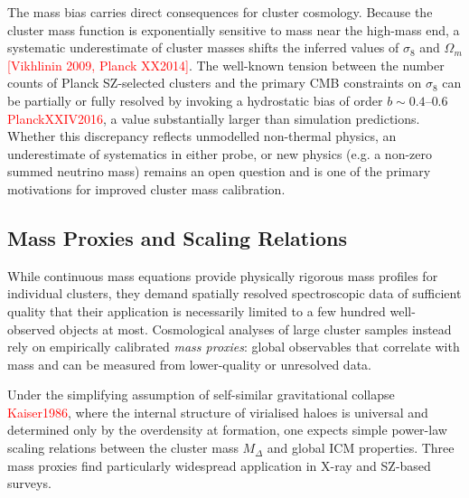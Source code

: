 The mass bias carries direct consequences for cluster cosmology. Because the cluster mass function is exponentially sensitive to mass near the high-mass end, a systematic underestimate of cluster masses shifts the inferred values of $\sigma_8$ and $\Omega_m$ \textcolor{red}{[Vikhlinin 2009, Planck XX2014]}. The well-known tension between the number counts of Planck SZ-selected clusters and the primary CMB constraints on $\sigma_8$ can be partially or fully resolved by invoking a hydrostatic bias of order $b \sim 0.4$--$0.6$ \textcolor{red}{PlanckXXIV2016}, a value substantially larger than simulation predictions. Whether this discrepancy reflects unmodelled non-thermal physics, an underestimate of systematics in either probe, or new physics (e.g. a non-zero summed neutrino mass) remains an open question and is one of the primary motivations for improved cluster mass calibration.

\subsection{Mass Proxies and Scaling Relations}
\label{sec:mass_proxies}

While continuous mass equations provide physically rigorous mass profiles for individual clusters, they demand spatially resolved spectroscopic data of sufficient quality that their application is necessarily limited to a few hundred well-observed objects at most. Cosmological analyses of large cluster samples instead rely on empirically calibrated \emph{mass proxies}: global observables that correlate with mass and can be measured from lower-quality or unresolved data.

Under the simplifying assumption of self-similar gravitational collapse \textcolor{red}{Kaiser1986}, where the internal structure of virialised haloes is universal and determined only by the overdensity at formation, one expects simple power-law scaling relations between the cluster mass $M_\Delta$ and global ICM properties. Three mass proxies find particularly widespread application in X-ray and SZ-based surveys.

